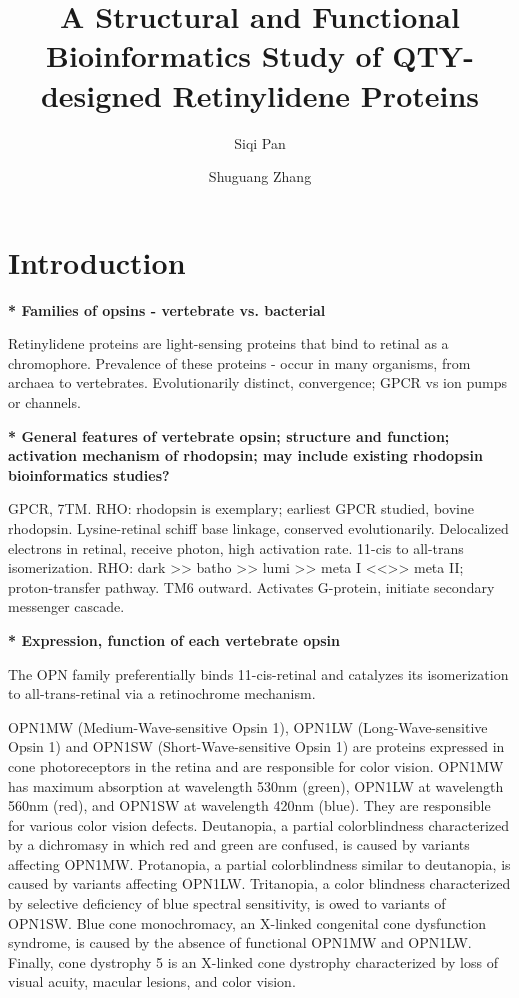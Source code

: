 \documentclass[fleqn,10pt,lineno]{manuscript}
\title{A Structural and Functional Bioinformatics Study of QTY-designed Retinylidene Proteins}
\author[1]{Siqi Pan}
\author[2]{Shuguang Zhang}
\affil[1]{Shanghai World Foreign Language Academy, 400 Baihua Street, Shanghai 200233, China}
\affil[2]{Lab of Molecular Architecture, Media Lab, Massachusetts Institute of Technology, 77 Massachusetts Avenue, Cambridge, MA 02139, USA}
\begin{document}
\flushbottom
\maketitle
\thispagestyle{empty}

\section*{Introduction}

\textbf{* Families of opsins - vertebrate vs. bacterial}

Retinylidene proteins are light-sensing proteins that bind to retinal as a chromophore. 
Prevalence of these proteins - occur in many organisms, from archaea to vertebrates. 
Evolutionarily distinct, convergence; GPCR vs ion pumps or channels. 

\textbf{* General features of vertebrate opsin; structure and function; activation mechanism of rhodopsin; may include existing rhodopsin bioinformatics studies?}

GPCR, 7TM. 
RHO: rhodopsin is exemplary; earliest GPCR studied, bovine rhodopsin. 
Lysine-retinal schiff base linkage, conserved evolutionarily. 
Delocalized electrons in retinal, receive photon, high activation rate. 
11-cis to all-trans isomerization.
RHO: dark >> batho >> lumi >> meta I <<>> meta II; proton-transfer pathway. 
TM6 outward. 
Activates G-protein, initiate secondary messenger cascade. 

\textbf{* Expression, function of each vertebrate opsin}

The OPN family preferentially binds 11-cis-retinal and catalyzes its isomerization to all-trans-retinal via a retinochrome mechanism. 

OPN1MW (Medium-Wave-sensitive Opsin 1), OPN1LW (Long-Wave-sensitive Opsin 1) and OPN1SW (Short-Wave-sensitive Opsin 1) are proteins expressed in cone photoreceptors in the retina and are responsible for color vision. OPN1MW has maximum absorption at wavelength 530nm (green), OPN1LW at wavelength 560nm (red), and OPN1SW at wavelength 420nm (blue). They are responsible for various color vision defects. Deutanopia, a partial colorblindness characterized by a dichromasy in which red and green are confused, is caused by variants affecting OPN1MW. Protanopia, a partial colorblindness similar to deutanopia, is caused by variants affecting OPN1LW. Tritanopia, a color blindness characterized by selective deficiency of blue spectral sensitivity, is owed to variants of OPN1SW. Blue cone monochromacy, an X-linked congenital cone dysfunction syndrome, is caused by the absence of functional OPN1MW and OPN1LW. Finally, cone dystrophy 5 is an X-linked cone dystrophy characterized by loss of visual acuity, macular lesions, and color vision. 
\end{document}
